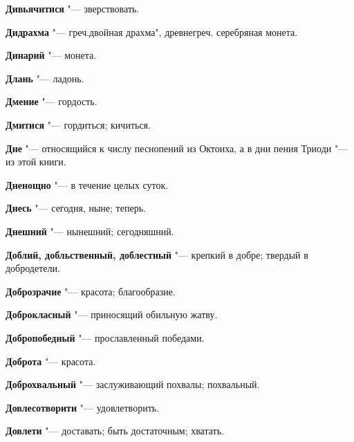\begin{mymulticols}{2}
\noindent\textbf{Дивьячитися} "--- зверствовать. 




\noindent\textbf{Дидрахма} "--- греч.двойная драхма", древнегреч. серебряная монета. 




\noindent\textbf{Динарий} "--- монета. 




\noindent\textbf{Длань} "--- ладонь. 




\noindent\textbf{Дмение} "--- гордость. 




\noindent\textbf{Дмитися} "--- гордиться; кичиться. 




\noindent\textbf{Дне} "--- относящийся к числу песнопений из Октоиха, а в дни пения Триоди "--- из этой книги. 




\noindent\textbf{Дненощно} "--- в течение целых суток. 




\noindent\textbf{Днесь} "--- сегодня, ныне; теперь. 




\noindent\textbf{Днешний} "--- нынешний; сегодняшний. 




\noindent\textbf{Доблий, добльственный, доблестный} "--- крепкий в добре; твердый в добродетели. 




\noindent\textbf{Доброзрачие} "--- красота; благообразие. 




\noindent\textbf{Доброкласный} "--- приносящий обильную жатву. 




\noindent\textbf{Добропобедный} "--- прославленный победами. 




\noindent\textbf{Доброта} "--- красота. 




\noindent\textbf{Доброхвальный} "--- заслуживающий похвалы; похвальный. 




\noindent\textbf{Довлесотворити} "--- удовлетворить. 




\noindent\textbf{Довлети} "--- доставать; быть достаточным; хватать. 





\end{mymulticols}

